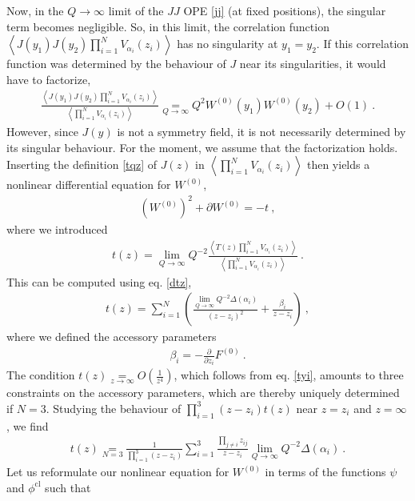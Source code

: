 \documentclass[12pt, a4paper, notitlepage, twoside]{report}
\numberwithin{equation}{section}
\theoremstyle{break}
\begin{document}
Now, in the $Q\to \infty$ limit of the $JJ$ OPE \eqref{jj} (at fixed positions), the singular term becomes negligible. So, in this limit, the correlation function $ \left\langle J(y_1)J(y_2)\prod_{i=1}^N V_{\alpha_i}(z_i) \right\rangle$ has no singularity at $y_1=y_2$. If this correlation function was determined by the behaviour of $J$ near its singularities, it would have to factorize,
\begin{align}
 \frac{\left\langle J(y_1)J(y_2)\prod_{i=1}^N V_{\alpha_i}(z_i)\right\rangle}{\left\langle \prod_{i=1}^N V_{\alpha_i}(z_i) \right\rangle} \underset{Q\to \infty}{=} Q^2W^{(0)}(y_1)W^{(0)}(y_2) + O(1)\ .
 \label{lqfac}
\end{align}
However, since $J(y)$ is not a symmetry field, it is not necessarily determined by its singular behaviour. For the moment, we assume that the factorization holds.
Inserting the definition \eqref{tqz} of $J(z)$ in $\left\langle \prod_{i=1}^N V_{\alpha_i}(z_i) \right\rangle$ then yields a nonlinear differential equation for $W^{(0)}$,
\begin{align}
 \boxed{\left(W^{(0)}\right)^2 + \partial W^{(0)} = - t}\ ,
\label{wwwt}
\end{align}
where we introduced
\begin{align}
 t(z) = \underset{Q\to \infty}{\lim} Q^{-2} \frac{\left\langle T(z) \prod_{i=1}^N V_{\alpha_i}(z_i) \right\rangle}{\left\langle \prod_{i=1}^N V_{\alpha_i}(z_i) \right\rangle}\ .
\end{align}
This can be computed using eq. \eqref{dtz}, 
\begin{align}
 t(z) = \sum_{i=1}^N \left( \frac{\underset{Q\to\infty}{\lim} Q^{-2}\Delta(\alpha_i)}{(z-z_i)^2} + \frac{\beta_i}{z-z_i} \right)\ ,
\label{tzs}
\end{align}
where we defined the accessory parameters
\begin{align}
 \beta_i = -{\frac{\partial}{\partial z_i}} F^{(0)}\ .
\end{align}
The condition $t(z) \underset{z\to \infty}{=} O(\frac{1}{z^4})$, which follows from eq. \eqref{tyi}, amounts to three constraints on the accessory parameters, which are thereby uniquely determined if $N= 3$. Studying the behaviour of $\prod_{i=1}^3(z-z_i)t(z)$ near $z=z_i$ and $z=\infty$, we find 
\begin{align}
 t(z) \underset{N=3}{=} \frac{1}{\prod_{i=1}^3(z-z_i)} \sum_{i=1}^3 \frac{\prod_{j\neq i} z_{ij}}{z-z_i}\underset{Q\to\infty}{\lim} Q^{-2}\Delta(\alpha_i)\ .
\end{align}
Let us reformulate our nonlinear equation for $W^{(0)}$ in terms of the functions $\psi$ and $\phi^\text{cl}$ such that
\end{document}
